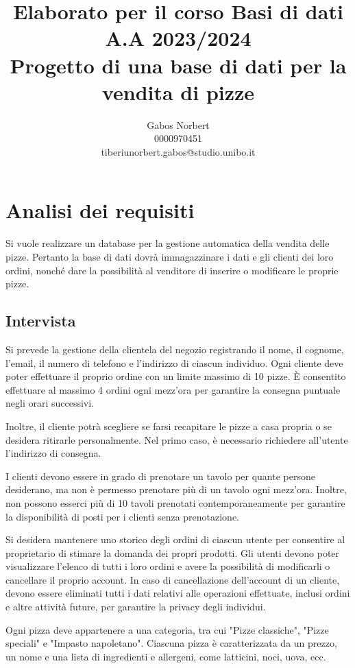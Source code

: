 \documentclass[a4paper,12pt, oneside]{article}
\title{\textbf{Elaborato per il corso Basi di dati} \\ \large A.A 2023/2024 \\ Progetto di una base di dati per la vendita di pizze}
\author{Gabos Norbert \\ 0000970451 \\ tiberiunorbert.gabos@studio.unibo.it }
\date{}
\begin{document}
\maketitle

\newpage
\tableofcontents{}
\newpage

\section{Analisi dei requisiti}

Si vuole realizzare un database per la gestione automatica della vendita
delle pizze. Pertanto la base di dati dovrà immagazzinare i dati e gli
clienti dei loro ordini, nonché dare la possibilità al venditore di
inserire o modificare le proprie pizze.

\subsection{Intervista}

Si prevede la gestione della clientela del negozio registrando il nome,
il cognome, l'email, il numero di telefono e l'indirizzo di ciascun
individuo. Ogni cliente deve poter effettuare il proprio ordine con un
limite massimo di 10 pizze. È consentito effettuare al massimo 4 ordini
ogni mezz'ora per garantire la consegna puntuale negli orari successivi.

Inoltre, il cliente potrà scegliere se farsi recapitare le pizze a casa
propria o se desidera ritirarle personalmente. Nel primo caso, è
necessario richiedere all'utente l'indirizzo di consegna.

I clienti devono essere in grado di prenotare un tavolo per quante
persone desiderano, ma non è permesso prenotare più di un tavolo ogni
mezz'ora. Inoltre, non possono esserci più di 10 tavoli prenotati
contemporaneamente per garantire la disponibilità di posti per i
clienti senza prenotazione.

Si desidera mantenere uno storico degli ordini di ciascun utente per
consentire al proprietario di stimare la domanda dei propri prodotti.
Gli utenti devono poter visualizzare l'elenco di tutti i loro ordini e
avere la possibilità di modificarli o cancellare il proprio account. In
caso di cancellazione dell'account di un cliente, devono essere
eliminati tutti i dati relativi alle operazioni effettuate, inclusi
ordini e altre attività future, per garantire la privacy degli
individui.

Ogni pizza deve appartenere a una categoria, tra cui "Pizze classiche",
"Pizze speciali" e "Impasto napoletano". Ciascuna pizza è caratterizzata
da un prezzo, un nome e una lista di ingredienti e allergeni, come
latticini, noci, uova, ecc.
\end{document}
